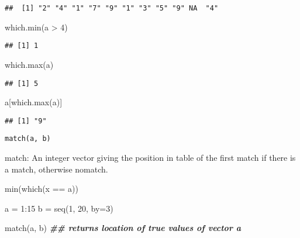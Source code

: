 \documentclass[
]{book}
\newenvironment{Shaded}{\begin{snugshade}}{\end{snugshade}}
\newcommand{\AttributeTok}[1]{\textcolor[rgb]{0.77,0.63,0.00}{#1}}
\newcommand{\DecValTok}[1]{\textcolor[rgb]{0.00,0.00,0.81}{#1}}
\newcommand{\DocumentationTok}[1]{\textcolor[rgb]{0.56,0.35,0.01}{\textbf{\textit{#1}}}}
\newcommand{\FunctionTok}[1]{\textcolor[rgb]{0.00,0.00,0.00}{#1}}
\newcommand{\NormalTok}[1]{#1}
\newcommand{\OtherTok}[1]{\textcolor[rgb]{0.56,0.35,0.01}{#1}}
\newcommand{\SpecialCharTok}[1]{\textcolor[rgb]{0.00,0.00,0.00}{#1}}
\begin{document}
\begin{verbatim}
##  [1] "2" "4" "1" "7" "9" "1" "3" "5" "9" NA  "4"
\end{verbatim}

\begin{Shaded}
\begin{Highlighting}[]
\FunctionTok{which.min}\NormalTok{(a }\SpecialCharTok{\textgreater{}} \DecValTok{4}\NormalTok{)}
\end{Highlighting}
\end{Shaded}

\begin{verbatim}
## [1] 1
\end{verbatim}

\begin{Shaded}
\begin{Highlighting}[]
\FunctionTok{which.max}\NormalTok{(a)}
\end{Highlighting}
\end{Shaded}

\begin{verbatim}
## [1] 5
\end{verbatim}

\begin{Shaded}
\begin{Highlighting}[]
\NormalTok{a[}\FunctionTok{which.max}\NormalTok{(a)]}
\end{Highlighting}
\end{Shaded}

\begin{verbatim}
## [1] "9"
\end{verbatim}

\texttt{match(a,\ b)}

match: An integer vector giving the position in table of the first match if there is a match, otherwise nomatch.

min(which(x == a))

\begin{Shaded}
\begin{Highlighting}[]
\NormalTok{a }\OtherTok{=} \DecValTok{1}\SpecialCharTok{:}\DecValTok{15}
\NormalTok{b }\OtherTok{=} \FunctionTok{seq}\NormalTok{(}\DecValTok{1}\NormalTok{, }\DecValTok{20}\NormalTok{, }\AttributeTok{by=}\DecValTok{3}\NormalTok{)}

\FunctionTok{match}\NormalTok{(a, b)  }\DocumentationTok{\#\# returns location of true values of vector a}
\end{Highlighting}
\end{Shaded}
\end{document}
